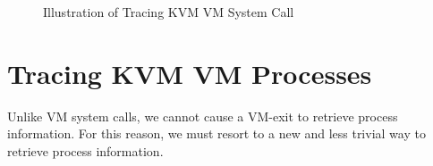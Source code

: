 \documentclass{report}
\begin{document}
\begin{spacing}{1.5}
\newpage
\vfill
{}
\begin{figure}[ht]
\centering
  \caption{Illustration of Tracing KVM VM System Call}
\end{figure}














\section{Tracing KVM VM Processes}

{\large
Unlike VM system calls, we cannot cause a VM-exit to retrieve process information. For this reason, we must resort to a new and less trivial way to retrieve process information.
\newline
}


\end{spacing}
\end{document}
